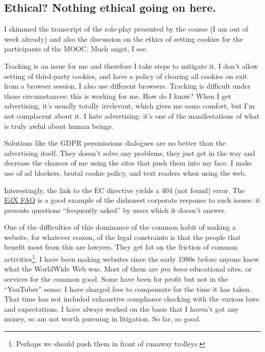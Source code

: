 \documentclass[
]{book}
\begin{document}
\hypertarget{ethical-nothing-ethical-going-on-here.}{%
\subsection{Ethical? Nothing ethical going on here.}\label{ethical-nothing-ethical-going-on-here.}}

I skimmed the transcript of the role-play presented by the course (I am out of week already) and also the discussion on the ethics of setting cookies for the participants of ths MOOC. Much angst, I see.

Tracking is an issue for me and therefore I take steps to mitigate it. I don't allow setting of third-party cookies, and have a policy of clearing all cookies on exit from a browser session. I also use different browsers. Tracking is difficult under those circumstances: this is working for me. How do I know? When I get advertising, it's usually totally irrelevant, which gives me some comfort, but I'm not complacent about it. I hate advertising: it's one of the manifestations of what is truly awful about human beings.

Solutions like the GDPR persmissions dialogues are no better than the advertising itself. They doesn't solve any problems, they just get in the way and decrease the chances of me using the sites that push them into my face. I make use of ad blockers, brutal cookie policy, and text readers when using the web.

Interestingly, the link to the EC directive yields a 404 (not found) error. The \href{https://support.edx.org/hc/en-us/articles/360004449033-Frequently-Asked-Questions-FAQs-about-GDPR}{EdX FAQ} is a good example of the dishonest corporate response to such issues: it presents questions ``frequently asked'' by users which it doesn't answer.

One of the difficulties of this dominance of the common habit of making a website, for whatever reason, of the legal constraints is that the people that benefit most from this are lawyers. They get fat on the friction of common activities\footnote{Perhaps we should push them in front of runaway trolleys.}. I have been making websites since the early 1980s before anyone knew what the WorldWide Web was. Most of them are \emph{pro bono} educational sites, or services for the common good. Some have been for profit but not in the ``YouTuber'' sense: I have charged fees to compensate for the time it has taken. That time has not included exhaustive compliance checking with the various laws and expectations. I have always worked on the basis that I haven't got any money, so am not worth pursuing in litigation. So far, so good.
\end{document}
